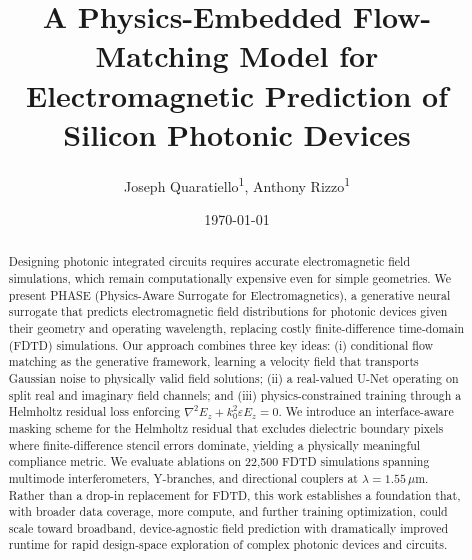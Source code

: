 \documentclass[%
 reprint,
 amsmath,amssymb,
 aps,
floatfix,
]{revtex4-2}
\begin{document}

\title{A Physics-Embedded Flow-Matching Model for \\Electromagnetic Prediction of Silicon Photonic Devices}

\author{Joseph Quaratiello\textsuperscript{1}, Anthony Rizzo\textsuperscript{1}}

\address{\textsuperscript{1}Thayer School of Engineering, Dartmouth College, Hanover, NH 03755}

\date{\today}%

\begin{abstract}
  Designing photonic integrated circuits requires accurate electromagnetic field simulations, which remain computationally expensive even for simple geometries. We present PHASE (Physics-Aware Surrogate for Electromagnetics), a generative neural surrogate that predicts electromagnetic field distributions for photonic devices given their geometry and operating wavelength, replacing costly finite-difference time-domain (FDTD) simulations. Our approach combines three key ideas: (i) conditional flow matching as the generative framework, learning a velocity field that transports Gaussian noise to physically valid field solutions; (ii) a real-valued U-Net operating on split real and imaginary field channels; and (iii) physics-constrained training through a Helmholtz residual loss enforcing $\nabla^2 E_z + k_0^2 \varepsilon E_z = 0$. We introduce an interface-aware masking scheme for the Helmholtz residual that excludes dielectric boundary pixels where finite-difference stencil errors dominate, yielding a physically meaningful compliance metric. We evaluate ablations on 22,500 FDTD simulations spanning multimode interferometers, Y-branches, and directional couplers at $\lambda=1.55\,\mu$m. Rather than a drop-in replacement for FDTD, this work establishes a foundation that, with broader data coverage, more compute, and further training optimization, could scale toward broadband, device-agnostic field prediction with dramatically improved runtime for rapid design-space exploration of complex photonic devices and circuits.
\end{abstract}

\maketitle
\end{document}
